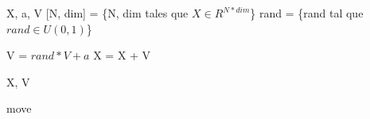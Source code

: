 \documentclass{article}
\begin{document}
\begin{algorithm}
\begin{algorithmic}[1]
    \REQUIRE X, a, V
    [N, dim] = \{N, dim tales que $X \in R^{N * dim}$\}
    \STATE rand = \{rand tal que $rand \in U(0,1)$\}

    \STATE V = $rand * V + a$
    \STATE X = X + V

    \RETURN X, V
\end{algorithmic}
\caption{move}
\end{algorithm}
\end{document}
